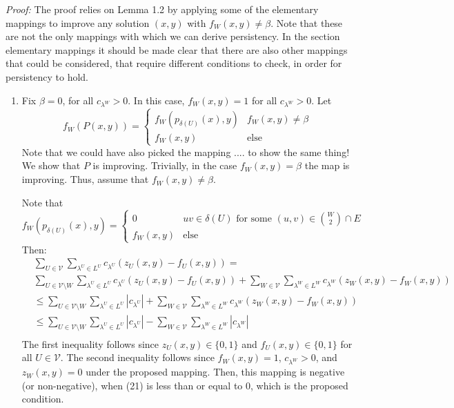 \textit{Proof:} The proof relies on Lemma 1.2 by applying some of the elementary mappings to improve any solution $(x,y)$ with $f_W(x,y) \neq \beta$. Note that these are not the only mappings with which we can derive persistency. In the section elementary mappings it should be made clear that there are also other mappings that could be considered, that require different conditions to check, in order for persistency to hold. 
\begin{enumerate}
    \item Fix $\beta=0$, for all $c_{\lambda^W} >0$. In this case, $f_W(x,y)=1$ for all $c_{\lambda^W} >0$.
    Let \begin{equation}
        f_W(P(x,y))= \begin{cases}
        f_W(p_{\delta(U)}(x),y) & f_W(x,y) \neq \beta \\
        f_W(x,y) & \text{else} 
        \end{cases}
    \end{equation}
    Note that we could have also picked the mapping .... to show the same thing! 
    We show that $P$ is improving. Trivially, in the case $f_W(x,y) = \beta$ the map is improving. Thus, assume that $f_W(x,y) \neq \beta$. 
    
    Note that \[ f_W(p_{\delta(U)}(x),y) = \begin{cases}
    0 & uv \in \delta(U) \text{ for some } (u,v) \in \binom{W}{2} \cap E \\
    f_W(x,y) & \text{else} 
    \end{cases} \]
    Then: 
    \begin{align*}
        & \sum_{U \in \mathcal{V}} \sum_{\lambda^U \in L^U} c_{\lambda^U} (z_U(x,y)- f_U(x,y)) = \\
       &  \sum_{U \in \mathcal{V} \setminus W} \sum_{\lambda^U \in L^U} c_{\lambda^U} (z_U(x,y)- f_U(x,y))  +  \sum_{W \in \mathcal{V}} \sum_{\lambda^W \in L^W} c_{\lambda^W} (z_W(x,y)- f_W(x,y))  \\
       & \leq \sum_{U \in \mathcal{V} \setminus W} \sum_{\lambda^U \in L^U} |c_{\lambda^U}| +  \sum_{W \in \mathcal{V}} \sum_{\lambda^W \in L^W} c_{\lambda^W} (z_W(x,y)- f_W(x,y)) \\
       & \leq \sum_{U \in \mathcal{V} \setminus W} \sum_{\lambda^U \in L^U} |c_{\lambda^U}| -\sum_{W \in \mathcal{V}} \sum_{\lambda^W \in L^W} |c_{\lambda^W}| \\
    \end{align*}
    The first inequality follows since $z_U(x,y) \in \{0,1\}$ and $f_U(x,y) \in \{0,1\}$ for all $U \in \mathcal{V}$. 
    The second inequality follows since $f_W(x,y)=1$, $c_{\lambda^W}>0$, and $z_W(x,y)=0$ under the proposed mapping. 
    Then, this mapping is negative (or non-negative), when (21) is less than or equal to 0, which is the proposed condition. 
    

\end{enumerate}
